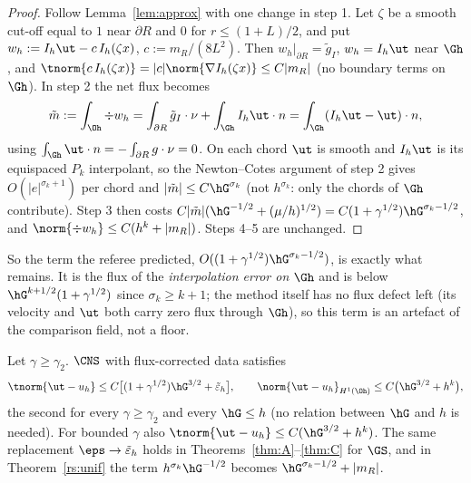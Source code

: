 \begin{proof}
Follow Lemma~\ref{lem:approx} with one change in step 1. Let $\zeta$ be a smooth cut-off equal to $1$ near $\partial R$ and $0$ for $r\le(1+L)/2$, and put $w_h:=I_h\ut-c\,I_h(\zeta x)$, $c:=m_R/(8L^2)$. Then $w_h|_{\partial R}=\tilde g_I$, $w_h=I_h\ut$ near $\Gh$, and $\tnorm{c\,I_h(\zeta x)}=|c|\norm{\nabla I_h(\zeta x)}\le C|m_R|$ (no boundary terms on $\Gh$). In step 2 the net flux becomes
\[
\tilde m:=\int_{\Oh}\div w_h=\int_{\partial R}\tilde g_I\cdot\nu+\int_{\Gh}I_h\ut\cdot n=\int_{\Gh}(I_h\ut-\ut)\cdot n ,
\]
using $\int_{\Gh}\ut\cdot n=-\int_{\partial R}g\cdot\nu=0$. On each chord $\ut$ is smooth and $I_h\ut$ is its equispaced $P_k$ interpolant, so the Newton--Cotes argument of step 2 gives $O(|e|^{\sigma_k+1})$ per chord and $|\tilde m|\le C\hG^{\sigma_k}$ (not $h^{\sigma_k}$: only the chords of $\Gh$ contribute). Step 3 then costs $C|\tilde m|(\hG^{-1/2}+(\mu/h)^{1/2})=C(1+\gamma^{1/2})\hG^{\sigma_k-1/2}$, and $\norm{\div w_h}\le C(h^k+|m_R|)$. Steps 4--5 are unchanged.
\end{proof}

So the term the referee predicted, $O((1+\gamma^{1/2})\hG^{\sigma_k-1/2})$, is exactly what remains. It is the flux of the \emph{interpolation error on $\Gh$} and is below $\hG^{k+1/2}(1+\gamma^{1/2})$ since $\sigma_k\ge k+1$; the method itself has no flux defect left (its velocity and $\ut$ both carry zero flux through $\Gh$), so this term is an artefact of the comparison field, not a floor.

\begin{theorem}\label{rs:Dfc}
Let $\gamma\ge\gamma_2$. $\CNS$ with flux-corrected data satisfies
\[
\tnorm{\ut-u_h}\le C\bigl[(1+\gamma^{1/2})\hG^{3/2}+\tilde\varepsilon_h\bigr],\qquad
\norm{\ut-u_h}_{H^1(\Oh)}\le C\bigl(\hG^{3/2}+h^k\bigr),
\]
the second for every $\gamma\ge\gamma_2$ and every $\hG\le h$ (no relation between $\hG$ and $h$ is needed). For bounded $\gamma$ also $\tnorm{\ut-u_h}\le C(\hG^{3/2}+h^k)$. The same replacement $\eps\to\tilde\varepsilon_h$ holds in Theorems~\ref{thm:A}--\ref{thm:C} for $\GS$, and in Theorem~\ref{rs:unif} the term $h^{\sigma_k}\hG^{-1/2}$ becomes $\hG^{\sigma_k-1/2}+|m_R|$.
\end{theorem}

